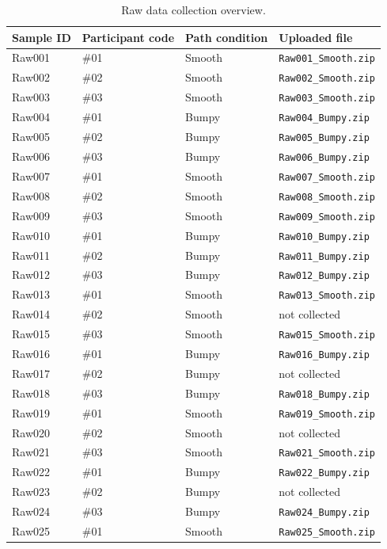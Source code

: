 \begin{table}[htbp]
\centering
\footnotesize
\caption{Raw data collection overview.}
\label{tab:raw-data-overview}
\begin{tabular}{llll}
\toprule
Sample ID & Participant code & Path condition & Uploaded file \\
\midrule
Raw001 & \#01 & Smooth & \texttt{Raw001\_Smooth.zip} \\
Raw002 & \#02 & Smooth & \texttt{Raw002\_Smooth.zip} \\
Raw003 & \#03 & Smooth & \texttt{Raw003\_Smooth.zip} \\
Raw004 & \#01 & Bumpy  & \texttt{Raw004\_Bumpy.zip} \\
Raw005 & \#02 & Bumpy  & \texttt{Raw005\_Bumpy.zip} \\
Raw006 & \#03 & Bumpy  & \texttt{Raw006\_Bumpy.zip} \\
Raw007 & \#01 & Smooth & \texttt{Raw007\_Smooth.zip} \\
Raw008 & \#02 & Smooth & \texttt{Raw008\_Smooth.zip} \\
Raw009 & \#03 & Smooth & \texttt{Raw009\_Smooth.zip} \\
Raw010 & \#01 & Bumpy  & \texttt{Raw010\_Bumpy.zip} \\
Raw011 & \#02 & Bumpy  & \texttt{Raw011\_Bumpy.zip} \\
Raw012 & \#03 & Bumpy  & \texttt{Raw012\_Bumpy.zip} \\
Raw013 & \#01 & Smooth & \texttt{Raw013\_Smooth.zip} \\
Raw014 & \#02 & Smooth & not collected \\
Raw015 & \#03 & Smooth & \texttt{Raw015\_Smooth.zip} \\
Raw016 & \#01 & Bumpy  & \texttt{Raw016\_Bumpy.zip} \\
Raw017 & \#02 & Bumpy  & not collected \\
Raw018 & \#03 & Bumpy  & \texttt{Raw018\_Bumpy.zip} \\
Raw019 & \#01 & Smooth & \texttt{Raw019\_Smooth.zip} \\
Raw020 & \#02 & Smooth & not collected \\
Raw021 & \#03 & Smooth & \texttt{Raw021\_Smooth.zip} \\
Raw022 & \#01 & Bumpy  & \texttt{Raw022\_Bumpy.zip} \\
Raw023 & \#02 & Bumpy  & not collected \\
Raw024 & \#03 & Bumpy  & \texttt{Raw024\_Bumpy.zip} \\
Raw025 & \#01 & Smooth & \texttt{Raw025\_Smooth.zip} \\

\end{tabular}
\end{table}
